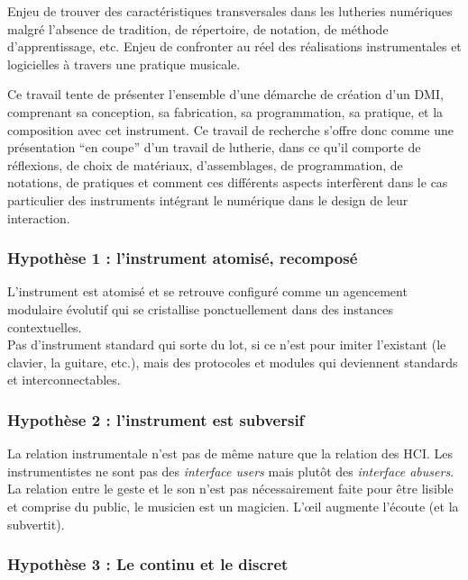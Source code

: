 Enjeu de trouver des caractéristiques transversales dans les lutheries numériques malgré l'absence de tradition, de répertoire, de notation, de méthode d'apprentissage, etc.
Enjeu de confronter au réel des réalisations instrumentales et logicielles à travers une pratique musicale.

Ce travail tente de présenter l'ensemble d'une démarche de création d'un \gls{DMI}, comprenant sa conception, sa fabrication, sa programmation, sa pratique, et la composition avec cet instrument.
Ce travail de recherche s'offre donc comme une présentation ``en coupe'' d'un travail de lutherie, dans ce qu'il comporte de réflexions, de choix de matériaux, d'assemblages, de programmation, de notations, de pratiques et comment ces différents aspects interfèrent dans le cas particulier des instruments intégrant le numérique dans le design de leur interaction.

\subsubsection*{Hypothèse 1 : l'instrument atomisé, recomposé}

L'instrument est atomisé et se retrouve configuré comme un agencement modulaire évolutif qui se cristallise ponctuellement dans des instances contextuelles. \\
Pas d'instrument standard qui sorte du lot, si ce n'est pour imiter l'existant (le clavier, la guitare, etc.), mais des protocoles et modules qui deviennent standards et interconnectables.

\subsubsection*{Hypothèse 2 : l'instrument est subversif}


La relation instrumentale n'est pas de même nature que la relation des HCI.
Les instrumentistes ne sont pas des \textit{interface users} mais plutôt des \textit{interface abusers}.
La relation entre le geste et le son n'est pas nécessairement faite pour être lisible et comprise du public, le musicien est un magicien.
L'œil augmente l'écoute (et la subvertit).


\subsubsection*{Hypothèse 3 : Le continu et le discret}

